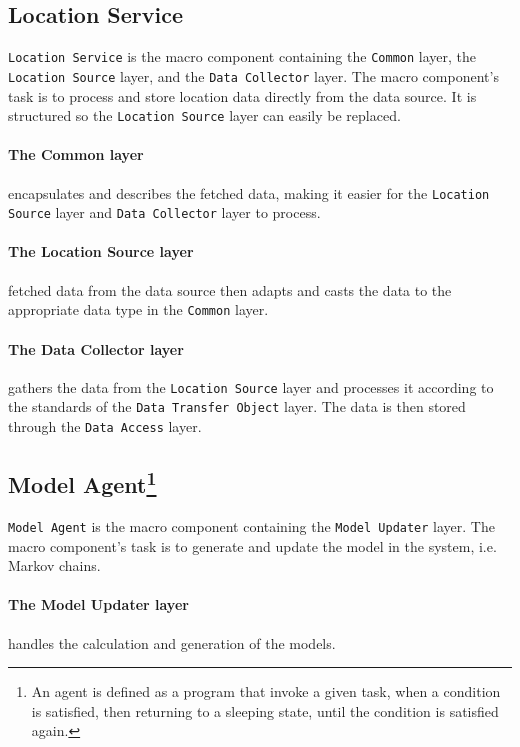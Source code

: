 \subsection*{Location Service}\texttt{Location Service} is the macro component containing the \texttt{Common} layer, the \texttt{Location Source} layer, and the \texttt{Data Collector} layer.
The macro component's task is to process and store location data directly from the data source. It is structured so the \texttt{Location Source} layer can easily be replaced.

\paragraph{The Common layer} encapsulates and describes the fetched data, making it easier for the \texttt{Location Source} layer and \texttt{Data Collector} layer to process.

\paragraph{The Location Source layer} fetched data from the data source then adapts and casts the data to the appropriate data type in the \texttt{Common} layer.

\paragraph{The Data Collector layer} gathers the data from the \texttt{Location Source} layer and processes it according to the standards of the \texttt{Data Transfer Object} layer. The data is then stored through the \texttt{Data Access} layer.


\subsection*{Model Agent\footnote{An agent is defined as a program that invoke a given task, when a condition is satisfied, then returning to a sleeping state, until the condition is satisfied again.\cite{definitionagent}}}\texttt{Model Agent} is the macro component containing the \texttt{Model Updater} layer.
The macro component's task is to generate and update the model in the system, i.e. Markov chains.

\paragraph{The Model Updater layer} handles the calculation and generation of the models.

